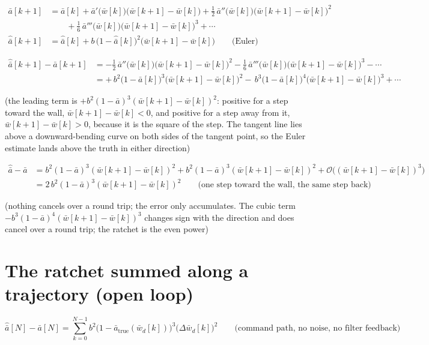 \documentclass[11pt,a4paper,fontset=none]{ctexart}
\newcommand{\ba}{\bar{a}}
\newcommand{\bw}{\bar{w}}
\begin{document}
\begin{align*}
\ba[k+1] &= \ba[k]
  + \ba'\bigl(\bw[k]\bigr)\bigl(\bw[k+1]-\bw[k]\bigr)
  + \tfrac{1}{2}\,\ba''\bigl(\bw[k]\bigr)\bigl(\bw[k+1]-\bw[k]\bigr)^{2} \\
  &\qquad
  + \tfrac{1}{6}\,\ba'''\bigl(\bw[k]\bigr)\bigl(\bw[k+1]-\bw[k]\bigr)^{3}
  + \cdots \\
\hat{\ba}[k+1] &= \hat{\ba}[k]
  + b\,\bigl(1-\hat{\ba}[k]\bigr)^{2}\bigl(\bw[k+1]-\bw[k]\bigr)
\qquad\text{(Euler)}
\end{align*}

\begin{align*}
\hat{\ba}[k+1] - \ba[k+1]
  &= -\tfrac{1}{2}\,\ba''\bigl(\bw[k]\bigr)\bigl(\bw[k+1]-\bw[k]\bigr)^{2}
     -\tfrac{1}{6}\,\ba'''\bigl(\bw[k]\bigr)\bigl(\bw[k+1]-\bw[k]\bigr)^{3}
     - \cdots \\
  &= +\,b^{2}\bigl(1-\ba[k]\bigr)^{3}\bigl(\bw[k+1]-\bw[k]\bigr)^{2}
     -\,b^{3}\bigl(1-\ba[k]\bigr)^{4}\bigl(\bw[k+1]-\bw[k]\bigr)^{3}
     + \cdots
\end{align*}

(the leading term is $+b^{2}(1-\ba)^{3}(\bw[k+1]-\bw[k])^{2}$: positive for a
step toward the wall, $\bw[k+1]-\bw[k] < 0$, and positive for a step away from
it, $\bw[k+1]-\bw[k] > 0$, because it is the square of the step. The tangent
line lies above a downward-bending curve on both sides of the tangent point,
so the Euler estimate lands above the truth in either direction)

\begin{align*}
\hat{\ba} - \ba &= b^{2}(1-\ba)^{3}(\bw[k+1]-\bw[k])^{2}
                 + b^{2}(1-\ba)^{3}(\bw[k+1]-\bw[k])^{2}
                 + \mathcal{O}\bigl((\bw[k+1]-\bw[k])^{3}\bigr) \\
                &= 2\,b^{2}(1-\ba)^{3}(\bw[k+1]-\bw[k])^{2}
\qquad\text{(one step toward the wall, the same step back)}
\end{align*}

(nothing cancels over a round trip; the error only accumulates. The cubic term
$-b^{3}(1-\ba)^{4}(\bw[k+1]-\bw[k])^{3}$ changes sign with the direction and
does cancel over a round trip; the ratchet is the even power)

\section{The ratchet summed along a trajectory (open loop)}

\begin{equation*}
\hat{\ba}[N] - \ba[N]
  = \sum_{k=0}^{N-1} b^{2}\bigl(1-\ba_{\mathrm{true}}(\bw_d[k])\bigr)^{3}
    \bigl(\Delta\bw_d[k]\bigr)^{2}
\qquad\text{(command path, no noise, no filter feedback)}
\end{equation*}
\end{document}
